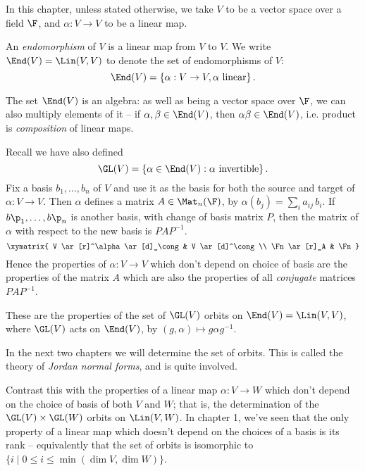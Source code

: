 \setcounter{lecture}{2}


In this chapter, unless stated otherwise, we take $V$ to be a vector space over a field $\F$, and $\alpha:V\to V$ to be a linear map.

\begin{definition}
	An \emph{endomorphism} of $V$ is a linear map from $V$ to $V$. We write $\End(V) = \Lin(V,V)$ to denote the set of endomorphisms of $V$: %
	\begin{equation*}
		\End(V) = \left\{\alpha:V\to V,\alpha \text{ linear}\right\}.
	\end{equation*}
\end{definition}

The set $\End(V)$ is an algebra: as well as being  a vector space over $\F$, we can also multiply elements of it -- if  $\alpha, \beta\in\End(V)$, then $\alpha \beta \in \End(V)$, i.e.{} product is \emph{composition} of linear maps.

Recall we have also defined
\begin{equation*}
	\GL(V) = \left\{\alpha\in\End(V):\alpha \text{ invertible}\right\}.
\end{equation*}
Fix a basis $b_1,\ldots,b_n$ of $V$ and use it as the basis for both the source and target of $\alpha:V\to V$. Then $\alpha$ defines a matrix $A\in\Mat_n(\F)$,  by $\alpha(b_j) = \sum_i a_{ij} \,b_i$. If $b\p_1,\ldots,b\p_n$ is another basis, with change of basis matrix $P$, then the matrix of $\alpha$ with respect to the new basis is $PAP^{-1}$.
\begin{equation*}
	\xymatrix{
		V
			\ar[r]^\alpha
			\ar[d]_\cong
		&
		V
			\ar[d]^\cong
		\\
		\Fn
			\ar[r]_A
		&
		\Fn
	}
\end{equation*}
Hence the properties of $\alpha:V\to V$ which don't depend on choice of basis are  the properties of the matrix $A$ which are also the properties of all \emph{conjugate} matrices $PAP^{-1}$.

These are the properties of the set of $\GL(V)$ orbits on $\End(V)=\Lin(V,V)$, where $\GL(V)$ acts on $ \End(V)$, by  $(g,\alpha)\mapsto g\alpha g^{-1}$.

In the next two chapters we will determine the set of orbits. This is called the theory of \emph{Jordan normal forms}, and is quite involved. 

Contrast this with the properties of a linear map $\alpha : V \to W$ which don't depend on the choice of basis of both $V$ and $W$; that is, the determination of the $\GL(V)\times \GL(W)$ orbits on $\Lin(V,W)$. In chapter 1, we've seen that the only property of a linear map which doesn't depend on the choices of a basis is its rank -- equivalently that the set of orbits is isomorphic to $\{i \mid 0\leq i\leq \min(\dim V,\dim W)\}$.

